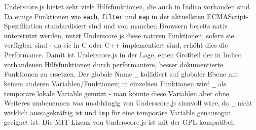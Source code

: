 Underscore.js bietet sehr viele Hilfsfunktionen, die auch in Indico vorhanden sind. Da einige
Funktionen wie \lstinline{each}, \lstinline{filter} und \lstinline{map} in der aktuellsten
ECMAScript-Spezifikation standardisiert sind und von manchen Browsern bereits nativ unterstützt
werden, nutzt Underscore.js diese nativen Funktionen, sofern sie verfügbar sind - da sie in C oder
C++ implementiert sind, erhöht dies die Performance. Damit ist Underscore.js in der Lage, einen
Großteil der in Indico vorhandenen Hilfsfunktionen durch performantere, besser dokumentierte
Funktionen zu ersetzen. Der globale Name \lstinline{_} kollidiert auf globaler Ebene mit keinen
anderen Variablen/Funktionen; in einzelnen Funktionen wird \lstinline{_} als temporäre lokale
Variable genutzt - man könnte diese Variablen aber ohne Weiteres umbenennen was unabhängig von
Underscore.js sinnvoll wäre, da \lstinline{_} nicht wirklich aussagekräftig ist und \lstinline{tmp}
für eine temporäre Variable genausogut geeignet ist. Die MIT-Lizenz von Underscore.js ist mit der
GPL kompatibel.
